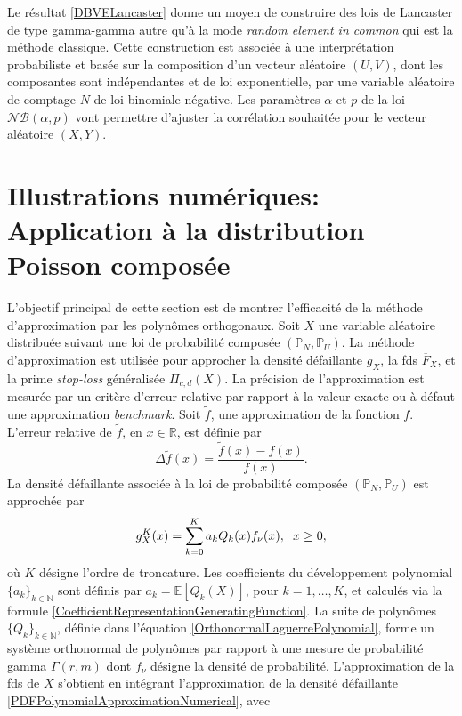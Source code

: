Le résultat \ref{DBVELancaster} donne un moyen de construire des lois de Lancaster de type gamma-gamma autre qu'à la mode \textit{random element in common} qui est la méthode classique. Cette construction est associée à une interprétation probabiliste et basée sur la composition d'un vecteur aléatoire $(U,V)$, dont les composantes sont indépendantes et de loi exponentielle, par une variable aléatoire de comptage $N$ de loi binomiale négative. Les paramètres $\alpha$ et $p$ de la loi $\mathcal{NB}(\alpha,p)$ vont permettre d'ajuster la corrélation souhaitée pour le vecteur aléatoire $(X,Y)$.  
\section{Illustrations numériques: Application à la distribution Poisson composée}
L'objectif principal de cette section est de montrer l'efficacité de la méthode d'approximation par les polynômes orthogonaux. Soit $X$ une variable aléatoire distribuée suivant une loi de probabilité composée $(\mathbb{P}_{N},\mathbb{P}_{U})$. La méthode d'approximation est utilisée pour approcher la densité défaillante $g_{X}$, la \gls{fds} $\overline{F}_{X}$, et la prime \textit{stop-loss} généralisée $\Pi_{c,d}(X)$. La précision de l'approximation est mesurée par un critère d'erreur relative par rapport à la valeur exacte ou à défaut une approximation \textit{benchmark}. Soit $\tilde{f}$, une approximation de la fonction $f$. L'erreur relative de $\tilde{f}$, en $x\in\mathbb{R}$, est définie par 
\begin{equation}\label{RelativeError}
\Delta \tilde{f}(x)=\frac{\tilde{f}(x)-f(x)}{f(x)}.
\end{equation}
La densité défaillante associée à la loi de probabilité composée $(\mathbb{P}_{N},\mathbb{P}_{U})$ est approchée par 
\begin{equation}\label{PDFPolynomialApproximationNumerical}
g_{X}^{K}(x)=\sum_{k=0}^{K}a_{k}Q_{k}(x)f_{\nu}(x), \hspace{0.2cm}x\geq0,
\end{equation}
où $K$ désigne l\rq{}ordre de troncature. Les coefficients du développement polynomial $\{a_{k}\}_{k\in\mathbb{N}}$ sont définis par $a_{k}=\mathbb{E}\left[Q_{k}
(X)\right]$, pour $k=1,\ldots,K$, et calculés via la formule \eqref{CoefficientRepresentationGeneratingFunction}. La suite de polynômes $\{Q_{k}\}_{k\in\mathbb{N}}$, définie dans l\rq{}équation \eqref{OrthonormalLaguerrePolynomial}, forme un système orthonormal de polynômes par rapport à une mesure de probabilité gamma $\Gamma(r,m)$ dont $f_{\nu}$ désigne la densité de probabilité. L\rq{}approximation de la \gls{fds} de $X$ s\rq{}obtient en intégrant l\rq{}approximation de la densité défaillante \eqref{PDFPolynomialApproximationNumerical}, avec 
